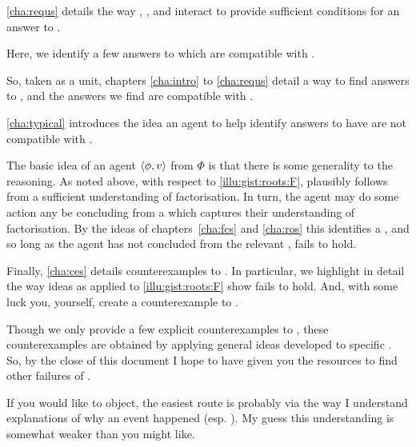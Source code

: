 \begin{note}
  \autoref{cha:requs} details the way , , and \progEx{} interact to provide sufficient conditions for an answer to \qWhy{}.

  Here, we identify a few answers to \qWhy{} which are compatible with \issueInclusion{}.

  So, taken as a unit, chapters \autoref{cha:intro} to \autoref{cha:requs} detail a way to find answers to \qWhy{}, and the answers we find are compatible with \issueInclusion{}.
\end{note}


\begin{note}
  \autoref{cha:typical} introduces the idea an agent \tCV{} to help identify answers to \qWhy{} have are not compatible with \issueInclusion{}.

  The basic idea of an agent \tCV{} \(\langle\phi, v\rangle\) from \(\Phi\) is that there is some generality to the \agents{} reasoning.
  As noted above, with respect to \autoref{illu:gist:roots:F},  plausibly follows from a sufficient understanding of factorisation.
  In turn, the agent may do some action any be concluding  from a \pool{} which captures their understanding of factorisation.
  By the ideas of chapters~\ref{cha:fcs} and \ref{cha:ros} this identifies a \fingfr{}, and so long as the agent has not concluded  from the relevant \pool{}, \issueInclusion{} fails to hold.
\end{note}


\begin{note}
  Finally, \autoref{cha:ces} details counterexamples to \issueInclusion{}.
  In particular, we highlight in detail the way ideas as applied to \autoref{illu:gist:roots:F} show \issueInclusion{} fails to hold.
    And, with some luck you, yourself, create a counterexample to \issueInclusion{}.
\end{note}


\begin{note}
  Though we only provide a few explicit counterexamples to \issueInclusion{}, these counterexamples are obtained by applying general ideas developed to specific .
  So, by the close of this document I hope to have given you the resources to find other failures of \issueInclusion{}.

  If you would like to object, the easiest route is probably via the way I understand explanations of why an event happened (esp. \progEx{}).
  My guess this understanding is somewhat weaker than you might like.
\end{note}



